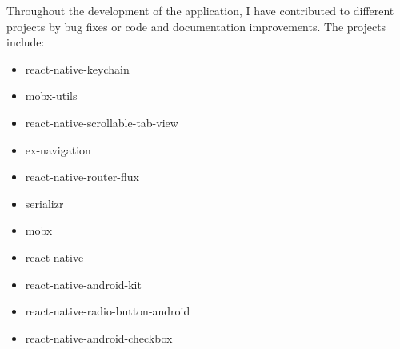 Throughout the development of the application, I have contributed to different projects by bug fixes or code and documentation improvements. The projects include: 


\begin{itemize}
\item react-native-keychain
\item mobx-utils
\item react-native-scrollable-tab-view
\item ex-navigation
\item react-native-router-flux
\item serializr
\item mobx
\item react-native
\item react-native-android-kit
\item react-native-radio-button-android
\item react-native-android-checkbox
\end{itemize}
